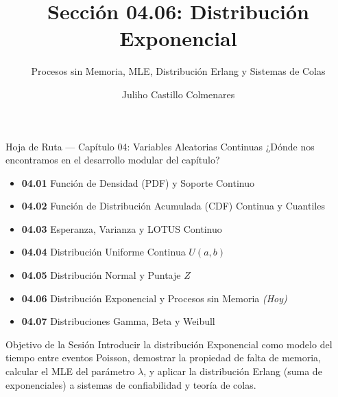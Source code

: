 \documentclass[10pt, aspectratio=169]{beamer}
\title[Distribución Exponencial]{Sección 04.06: Distribución Exponencial}
\subtitle{Procesos sin Memoria, MLE, Distribución Erlang y Sistemas de Colas}
\author[J. Castillo Colmenares]{Juliho Castillo Colmenares}
\institute{Tecnológico de Monterrey}
\date{\vspace{-1.2cm}}
\begin{document}
\begin{frame}[plain]
  \titlepage
\end{frame}

\begin{frame}{Hoja de Ruta --- Capítulo 04: Variables Aleatorias Continuas}
  \footnotesize
  ¿Dónde nos encontramos en el desarrollo modular del capítulo? \pause
  \begin{itemize}\itemsep=0.08em
    \item \textbf{04.01} Función de Densidad (PDF) y Soporte Continuo \pause
    \item \textbf{04.02} Función de Distribución Acumulada (CDF) Continua y Cuantiles \pause
    \item \textbf{04.03} Esperanza, Varianza y LOTUS Continuo \pause
    \item \textbf{04.04} Distribución Uniforme Continua $U(a, b)$ \pause
    \item \textbf{04.05} Distribución Normal y Puntaje $Z$ \pause
    \item \textbf{04.06} Distribución Exponencial y Procesos sin Memoria \emph{(Hoy)} \pause
    \item \textbf{04.07} Distribuciones Gamma, Beta y Weibull
  \end{itemize}
  \vspace{-0.05cm}
  \begin{block}{Objetivo de la Sesión}
    Introducir la distribución Exponencial como modelo del tiempo entre eventos Poisson, demostrar la propiedad de falta de memoria, calcular el MLE del parámetro $\lambda$, y aplicar la distribución Erlang (suma de exponenciales) a sistemas de confiabilidad y teoría de colas.
  \end{block}
\end{frame}
\end{document}
